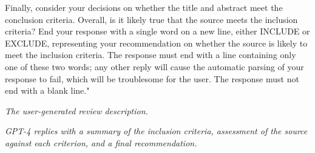 \documentclass{article}
\begin{document}
\begin{description}
    Finally, consider your decisions on whether the title and abstract meet the
    conclusion criteria. Overall, is it likely true that the source meets the
    inclusion criteria? End your response with a single word on a new line, either
    INCLUDE or EXCLUDE, representing your recommendation on whether the source is
    likely to meet the inclusion criteria. The response must end with a line
    containing only one of these two words; any other reply will cause the
    automatic parsing of your response to fail, which will be troublesome for the
    user. The response must not end with a blank line."

    \User \textit{The user-generated review description.}

    \GPT \textit{GPT-4 replies with a summary of the inclusion criteria,
    assessment of the source against each criterion, and a final
    recommendation.}

\end{description}
\end{document}
